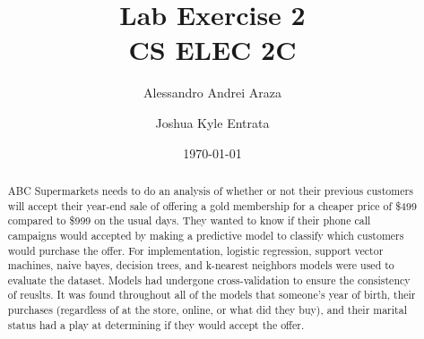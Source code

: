 

\title{{\Huge Lab Exercise 2}\\{\small CS ELEC 2C}}
\author{Alessandro Andrei Araza \and Joshua Kyle Entrata}
\date{\today}



    \maketitle

    \begin{abstract}
        ABC Supermarkets needs to do an analysis of whether or not their previous customers will accept their year-end sale of offering a gold membership for a cheaper price of \$499 compared to \$999 on the usual days. They wanted to know if their phone call campaigns would accepted by making a predictive model to classify which customers would purchase the offer. For implementation, logistic regression, support vector machines, naive bayes, decision trees, and k-nearest neighbors models were used to evaluate the dataset. Models had undergone cross-validation to ensure the consistency of reuslts. It was found throughout all of the models that someone's year of birth, their purchases (regardless of at the store, online, or what did they buy), and their marital status had a play at determining if they would accept the offer. 

        \vspace{0.5\baselineskip}
        \noindent
    \end{abstract}

    \begin{multicols}{2}
        
        
        
        
        
    \end{multicols}




